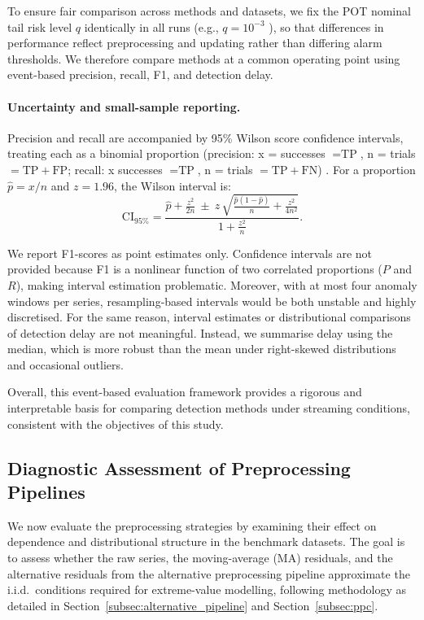 \documentclass{statsmsc}
\begin{document}
To ensure fair comparison across methods and datasets, we fix the POT nominal tail risk level \(q\) identically in all runs 
(e.g., \( q = 10 ^{-3}\) ), so that differences in performance reflect preprocessing and updating rather than differing 
alarm thresholds. We therefore compare methods at a common operating point using event-based precision, recall, F1, 
and detection delay.

\paragraph{Uncertainty and small-sample reporting.}
Precision and recall are accompanied by 95\% Wilson score confidence intervals, treating each as a binomial proportion
(precision: x = successes \(=\text{TP}\), n = trials \(=\text{TP}+\text{FP}\);
recall: x successes \(=\text{TP}\), n = trials \(=\text{TP}+\text{FN}\)) \citep{wilson1927}. For a proportion 
\(\hat p = x/n\) and \(z=1.96\), the Wilson interval is:
\[
\mathrm{CI}_{95\%} = \frac{\hat p + \frac{z^2}{2n}\ \pm\
z\,\sqrt{\frac{\hat p(1-\hat p)}{n} + \frac{z^2}{4n^2}}
}{1 + \frac{z^2}{n}}.
\]

We report F1-scores as point estimates only. Confidence intervals are not provided because F1 is a nonlinear function
of two correlated proportions ($P$ and $R$), making interval estimation problematic. Moreover, with at most four anomaly
windows per series, resampling-based intervals would be both unstable and highly discretised. For the same reason, 
interval estimates or distributional comparisons of detection delay are not meaningful. Instead, we summarise delay 
using the median, which is more robust than the mean under right-skewed distributions and occasional outliers.

Overall, this event-based evaluation framework provides a rigorous and interpretable basis 
for comparing detection methods under streaming conditions, consistent with the objectives of this study.

\subsection{Diagnostic Assessment of Preprocessing Pipelines}\label{subsec:evt_diagnostic} 
We now evaluate the preprocessing strategies by examining their effect on dependence and distributional structure 
in the benchmark datasets. The goal is to assess whether the raw series, the moving-average (MA) residuals, and the 
alternative residuals from the alternative preprocessing pipeline approximate the i.i.d.\ conditions required for extreme-value modelling, 
following methodology as detailed in Section~\ref{subsec:alternative_pipeline} and Section~\ref{subsec:ppc}.
\end{document}
